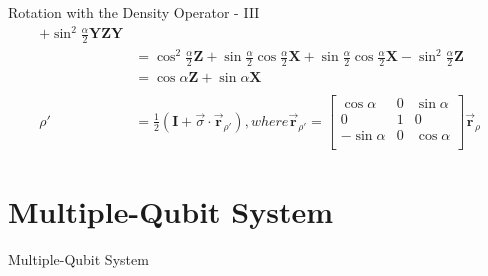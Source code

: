 \documentclass{beamer}
\begin{document}
\begin{frame}{Rotation with the Density Operator - III}
{\begin{align*}
                + \sin^2\frac{\alpha}2 \mathbf{Y}\mathbf{Z}\mathbf{Y} \\
            &=    \cos^2\frac{\alpha}2 \mathbf{Z}
                + \sin\frac{\alpha}2 \cos\frac{\alpha}2 \mathbf{X}
                + \sin\frac{\alpha}2 \cos\frac{\alpha}2 \mathbf{X}
                - \sin^2\frac{\alpha}2 \mathbf{Z} \\
            &= \cos\alpha \mathbf{Z} + \sin\alpha \mathbf{X} \\
      \\
      \rho' &= \frac{1}2 ( \mathbf{I} + \overrightarrow{\sigma} \cdot \overrightarrow{\mathbf{r}}_{\rho'} )
            , where \overrightarrow{\mathbf{r}}_{\rho'} =
              \begin{bmatrix}
                \cos\alpha  & 0 & \sin\alpha \\
                0           & 1 & 0 \\
                -\sin\alpha & 0 & \cos\alpha \\
              \end{bmatrix}
              \overrightarrow{\mathbf{r}}_{\rho}
    \end{align*}
  }%
\end{frame}

\section{Multiple-Qubit System}
\begin{frame}
  Multiple-Qubit System
\end{frame}
\end{document}
